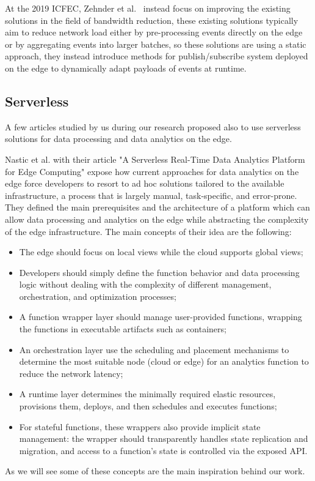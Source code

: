 At the 2019 ICFEC, Zehnder et al.~\cite{virtual-events-edge} instead focus on improving the existing solutions in the field of bandwidth reduction, these existing solutions typically aim to reduce network load either by pre-processing events directly on the edge or by aggregating events into larger batches, so these solutions are using a static approach, they instead introduce methods for publish/subscribe system deployed on the edge to dynamically adapt payloads of events at runtime.


\subsection{Serverless}
A few articles studied by us during our research proposed also to use serverless solutions for data processing and data analytics on the edge.

Nastic et al. with their article "A Serverless Real-Time Data Analytics Platform for Edge Computing" \cite{serverless-analytics-edge} expose how current approaches for data analytics on the edge force developers to resort to ad hoc solutions tailored to the available infrastructure, a process that is largely manual, task-specific, and error-prone. They defined the main prerequisites and the architecture of a platform which can allow data processing and analytics on the edge while abstracting the complexity of the edge infrastructure. The main concepts of their idea are the following:
\begin{itemize}
    \item The edge should focus on local views while the cloud supports global views;
    \item Developers should simply define the function behavior and data processing logic without dealing with the complexity of different management, orchestration, and optimization processes;
    \item A function wrapper layer should manage user-provided functions, wrapping the functions in executable artifacts such as containers;
    \item An orchestration layer use the scheduling and placement mechanisms to determine the most suitable node (cloud or edge) for an analytics function to reduce the network latency;
    \item A runtime layer determines the minimally required elastic resources, provisions them, deploys, and then schedules and executes functions;
    \item For stateful functions, these wrappers also provide implicit state management: the wrapper should transparently handles state replication and migration, and access to a function’s state is controlled via the exposed API.
\end{itemize}
As we will see some of these concepts are the main inspiration behind our work.

